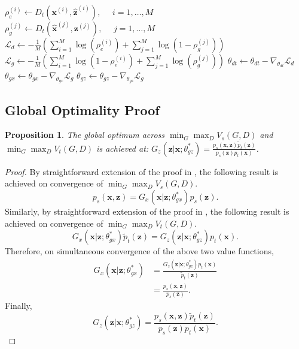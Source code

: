 \documentclass{article}
\newtheorem{prop}{Proposition}
\begin{document}
\begin{algorithm}[h!]
\begin{algorithmic}
	\STATE $\rho_e^{(i)} \leftarrow D_t(\bm{x}^{(i)}, \hat{\bm{z}}^{(i)}), \ \ \ \ \ \ i = 1, \dots, M $ 
	\STATE $\rho_g^{(j)} \leftarrow D_t(\hat{\bm{x}}^{(j)}, \bm{z}^{(j)}), \ \ \ \ \ \ j = 1, \dots, M $
	\STATE $\mathcal{L}_d \leftarrow -\frac{1}{M} \left( \sum_{i=1}^{M} \log \left( \rho_e^{(i)} \right) + \sum_{j=1}^{M} \log \left( 1 - \rho_g^{(j)} \right) \right)$
	\STATE $\mathcal{L}_g \leftarrow -\frac{1}{M} \left( \sum_{i=1}^{M} \log \left( 1 - \rho_e^{(i)} \right) + \sum_{j=1}^{M} \log \left(\rho_g^{(j)} \right) \right)$
	\STATE $\theta_{dt} \leftarrow \theta_{dt} - \nabla_{\theta_{dt}}\mathcal{L}_d$
	\STATE $\theta_{gx} \leftarrow \theta_{gx} - \nabla_{\theta_{gx}}\mathcal{L}_g$
	\STATE $\theta_{gz} \leftarrow \theta_{gz} - \nabla_{\theta_{gz}}\mathcal{L}_g$
	\ENDFOR
\end{algorithmic}
\end{algorithm}

\subsection{Global Optimality Proof}

\begin{prop}

The global optimum across $\min_{G} \max_{D} V_s(G, D)$ and $\min_{G} \max_{D} V_t(G, D)$ is achieved at: $G_z(\bm{z}|\bm{x}; \theta_{gz}^*) = \frac{p_s(\bm{x},\bm{z})\widetilde{p}_t(\bm{z})}{p_s(\bm{z})p_t(\bm{x})}$.
\end{prop}

\begin{proof}
By straightforward extension of the proof in \cite{goodfellow2014generative}, the following result is achieved on convergence of $\min_{G} \max_{D} V_s(G, D)$. 
\begin{equation}
p_s(\bm{x},\bm{z}) = G_x(\bm{x}|\bm{z};\theta_{gx}^*)p_s(\bm{z}).
\end{equation}
Similarly, by straightforward extension of the proof in \cite{dumoulin2016adversarially}, the following result is achieved on convergence of $\min_{G} \max_{D} V_t(G, D)$.
\begin{equation}
G_x(\bm{x}|\bm{z};\theta_{gx}^*)\widetilde{p}_t(\bm{z}) = G_z(\bm{z}|\bm{x}; \theta_{gz}^*)p_t(\bm{x}).
\end{equation}
Therefore, on simultaneous convergence of the above two value functions,
\begin{equation}
\begin{split}
G_x(\bm{x}|\bm{z};\theta_{gx}^*) &= \frac{G_z(\bm{z}|\bm{x}; \theta_{gz}^*)p_t(\bm{x})}{\widetilde{p}_t(\bm{z})}\\
&= \frac{p_s(\bm{x},\bm{z})}{p_s(\bm{z})}.
\end{split}
\end{equation}
Finally,
\begin{equation}
G_z(\bm{z}|\bm{x}; \theta_{gz}^*) = \frac{p_s(\bm{x},\bm{z})\widetilde{p}_t(\bm{z})}{p_s(\bm{z})p_t(\bm{x})}.
\end{equation}
\end{proof}
\end{document}
